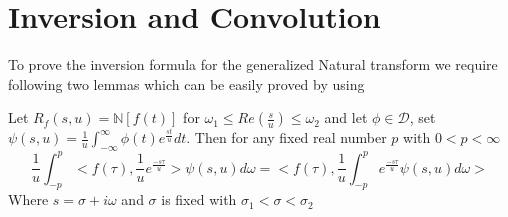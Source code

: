 \section{Inversion and Convolution}
To prove the inversion formula for the generalized  Natural transform we require following two lemmas which can be easily proved by using\cite{R97}\\
 \begin{lemma}
 Let $ R_{f}(s,u)=\mathbb{N}[f(t)]$ for $\omega_{1}\leq Re(\frac{s}{u})\leq \omega_{2}$ and let $\phi \in \mathcal{D}$, set $\psi(s,u)=\frac{1}{u}\int_{-\infty}^{\infty}\phi(t)e^{\frac{st}{u}}dt$. Then for any fixed real number $p$ with $ 0<p<\infty $
\begin{equation}
\frac{1}{u}\int_{-p}^{p}<f(\tau),\frac{1}{u}e^{\frac{-s\tau}{u}}>\psi(s,u)d\omega=<f(\tau),\frac{1}{u}\int_{-p}^{p}e^{\frac{-s\tau}{u}}\psi(s,u)d\omega>
\end{equation}
 Where $ s=\sigma+i\omega $ and $\sigma$ is fixed with $\sigma_{1}<\sigma<\sigma_{2}$
 \end{lemma}
 
